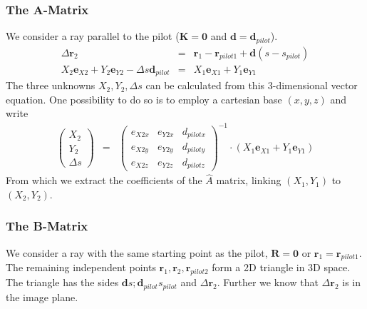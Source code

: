 \documentclass[12pt,a4paper,twoside,openright,BCOR10mm,headsepline,titlepage,abstracton,chapterprefix,final]{scrreprt}
\newcommand\Vector[1]{{\mathbf{#1}}}
\begin{document}
\subsubsection{The A-Matrix}
We consider a ray parallel to the pilot ($\Vector{K} = \Vector{0}$ and $\Vector{d} = \Vector{d}_{pilot}$).
\begin{eqnarray}
 \Delta \Vector{r}_2 &=& \Vector{r}_{1} - \Vector{r}_{pilot1} + \Vector{d} ( s - s_{pilot} ) \\
 X_2 \Vector{e}_{X2} +  Y_2 \Vector{e}_{Y2} - \Delta s \Vector{d}_{pilot} &=&  X_1 \Vector{e}_{X1} +  Y_1 \Vector{e}_{Y1} 
\end{eqnarray}
The three unknowns $X_2 , Y_2, \Delta s$ can be calculated from this 3-dimensional vector equation.
One possibility to do so is to employ a cartesian base $(x,y,z)$ and write
\begin{eqnarray}
 \begin{pmatrix}
  X_2 \\ Y_2 \\ \Delta s
 \end{pmatrix}
 &=&
 \begin{pmatrix}
  e_{X2x} & e_{Y2x} & d_{pilotx} \\
  e_{X2y} & e_{Y2y} & d_{piloty} \\
  e_{X2z} & e_{Y2z} & d_{pilotz}  
 \end{pmatrix}^{-1}
 \cdot
 \left(
 X_1 \Vector{e}_{X1} + Y_1 \Vector{e}_{Y1}
 \right)
\end{eqnarray}
From which we extract the coefficients of the $\hat{A}$ matrix, 
linking $(X_1,Y_1)$ to $(X_2,Y_2)$.

\subsubsection{The B-Matrix}
We consider a ray with the same starting point as the pilot, $\Vector{R} = \Vector{0}$ or $\Vector{r}_{1} = \Vector{r}_{pilot1}$. 
The remaining independent points $\Vector{r}_{1}, \Vector{r}_{2}, \Vector{r}_{pilot2}$ form a 2D triangle in 3D space.
The triangle has the sides $\Vector{d} s ; \Vector{d}_{pilot} s_{pilot}$ and $\Delta \Vector{r}_2$. 
Further we know that $\Delta \Vector{r}_2$ is in the image plane.
\end{document}
